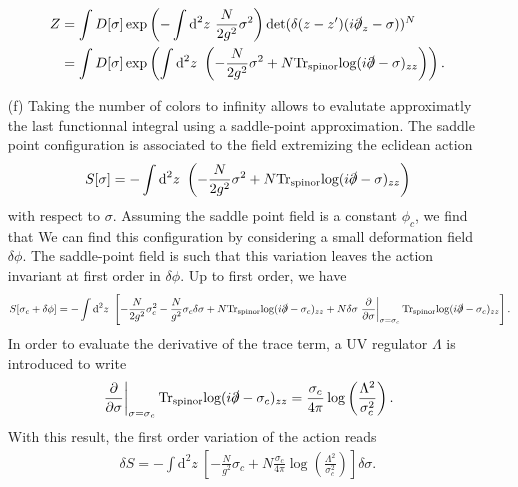 \documentclass[10pt, a4paper]{article}
\begin{document}
\begin{enumerate}
  \begin{align*}
    Z &= \int D[\sigma] \exp\left(- \int \text{d}^2 z\ \frac{N}{2g^2}\sigma^2\right) \text{det}(\delta(z-z') (i\slashed{\partial}_{z} - \sigma))^N\\
    &= \int D[\sigma] \exp\left(\int \text{d}^2 z\ \left(-\frac{N}{2g^2}\sigma^2 + N \text{Tr}_{\text{spinor}}\text{log}(i  \slashed{\partial} - \sigma)_{zz}\right)\right).  
  \end{align*}
  \item[(f)] Taking the number of colors to infinity allows to evalutate approximatly the last functionnal integral using a saddle-point approximation. The saddle point configuration is associated to the field extremizing the eclidean action
  \begin{align*}
    S[\sigma] = -\int \text{d}^2 z\ \left(-\frac{N}{2g^2}\sigma^2 + N \text{Tr}_{\text{spinor}}\text{log}(i  \slashed{\partial} - \sigma)_{zz}\right)
  \end{align*}
  with respect to $\sigma$. Assuming the saddle point field is a constant $\phi_c$, we find that 
  We can find this configuration by considering a small deformation field $\delta \phi$. The saddle-point field is such that this variation leaves the action invariant at first order in $\delta \phi$. Up to first order, we have 
  \begin{align*}
    S[\sigma_c + \delta \phi] = -\int \text{d}^2 z\ \left[-\frac{N}{2g^2}\sigma_c^2 - \frac{N}{g^2} \sigma_c \delta\sigma + N \text{Tr}_{\text{spinor}}\text{log}(i  \slashed{\partial} - \sigma_c)_{zz} + N \delta\sigma\left.\frac{\partial}{\partial \sigma}\right|_{\sigma = \sigma_c} \text{Tr}_{\text{spinor}}\text{log}(i  \slashed{\partial} - \sigma_c)_{zz}\right].
  \end{align*} 
  In order to evaluate the derivative of the trace term, a UV regulator $\Lambda$ is introduced to write 
  \begin{align*}
    \left.\frac{\partial}{\partial \sigma}\right|_{\sigma = \sigma_c} \text{Tr}_{\text{spinor}}\text{log}(i  \slashed{\partial} - \sigma_c)_{zz} = \frac{\sigma_c}{4 \pi} \log \left(\frac{\Lambda^2}{\sigma_c^2}\right).
  \end{align*}
  With this result, the first order variation of the action reads
  \begin{align*}
     \delta S = -\int \text{d}^2 z\ \left[ - \frac{N}{g^2} \sigma_c + N \frac{\sigma_c}{4 \pi} \log \left(\frac{\Lambda^2}{\sigma_c^2}\right)\right] \delta\sigma.
  \end{align*} 

\end{enumerate}
\end{document}
